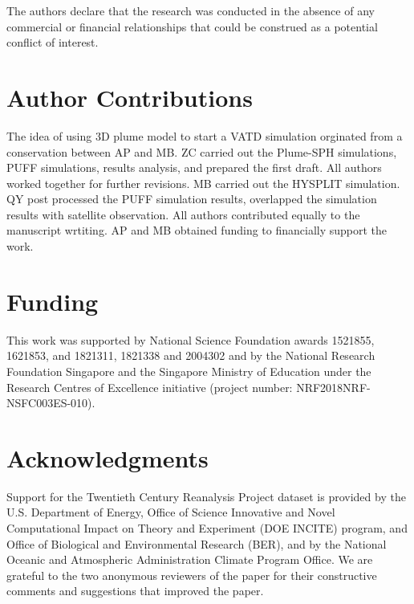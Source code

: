 \documentclass[utf8]{frontiersSCNS} %
\begin{document}
The authors declare that the research was conducted in the absence of any commercial or financial relationships that could be construed as a potential conflict of interest.

\section*{Author Contributions}
The idea of using 3D plume model to start a VATD simulation orginated from a conservation between AP and MB. ZC carried out the Plume-SPH simulations, PUFF simulations, results analysis, and prepared the first draft. All authors worked together for further revisions.  MB carried out the HYSPLIT simulation. QY post processed the PUFF simulation results, overlapped the simulation results with satellite observation. All authors contributed equally to the manuscript wrtiting. AP and MB obtained funding to financially support the work.

\section*{Funding}
This work was supported by National Science Foundation awards 1521855, 1621853, and 1821311, 1821338  and 2004302 and by the National Research Foundation Singapore and the Singapore Ministry of Education under the Research Centres of Excellence initiative (project number: NRF2018NRF-NSFC003ES-010). 

\section*{Acknowledgments}
Support for the Twentieth Century Reanalysis Project dataset is provided by the U.S. Department of Energy, Office of Science Innovative and Novel Computational Impact on Theory and Experiment (DOE INCITE) program, and Office of Biological and Environmental Research (BER), and by the National Oceanic and Atmospheric Administration Climate Program Office. We are grateful to the two anonymous reviewers of the paper for their constructive comments and suggestions that improved the paper.

\end{document}
